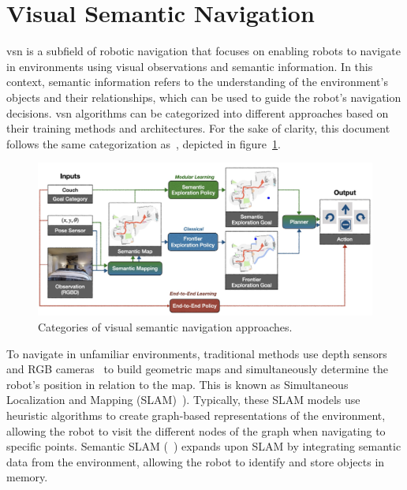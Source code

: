\section{Visual Semantic Navigation}\label{sec:visual-semantic-navigation}

\acrfull{vsn} is a subfield of robotic navigation that focuses on enabling robots to navigate in environments using visual observations and semantic information.
In this context, semantic information refers to the understanding of the environment's objects and their relationships, which can be used to guide the robot's navigation decisions.
\acrshort{vsn} algorithms can be categorized into different approaches based on their training methods and architectures.
For the sake of clarity, this document follows the same categorization as~\cite{gervet2022}, depicted in figure~\ref{fig:vsn-categories}.

\begin{figure}
    \centering
    \includegraphics[width=\textwidth]{figures/related_work/methods_overview}
    \caption{Categories of visual semantic navigation approaches.}
    \label{fig:vsn-categories}
\end{figure}

To navigate in unfamiliar environments, traditional methods use depth sensors~\cite{newcombe2011, thrun2001} and RGB cameras~\cite{jones2011, sattler2018} to build geometric maps and simultaneously determine the robot's position in relation to the map.
This is known as Simultaneous Localization and Mapping (SLAM)~\cite{Kazerouni2022, campos2021, labbe2022}).
Typically, these SLAM models use heuristic algorithms to create graph-based representations of the environment, allowing the robot to visit the different nodes of the graph when navigating to specific points.
Semantic SLAM (\eg~\cite{zhang2018, rosinol2020, jin2023}) expands upon SLAM by integrating semantic data from the environment, allowing the robot to identify and store objects in memory.

